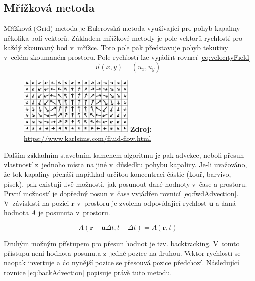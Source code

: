 \subsection{Mřížková metoda}
\label{chapter:Grid}
Mřížková (Grid) metoda je Eulerovská metoda využívající pro pohyb kapaliny několika polí vektorů. Základem mřížkové metody je pole vektorů rychlostí pro každý zkoumaný bod v~mřížce. Toto pole pak představuje pohyb tekutiny v~celém zkoumaném prostoru. Pole rychlostí lze vyjádřit rovnicí \ref{eq:velocityField}
\begin{equation}
	\Vec{u}(x,y) = (u_x,u_y)
	\label{eq:velocityField}
\end{equation}

\begin{figure}[hbt]
	\captionsetup{justification=centering}
	\centering
	\includegraphics[width=0.5\textwidth]{obrazky-figures/flow-field.png}
	\textbf{Zdroj: } \url{https://www.karlsims.com/fluid-flow.html}
	\label{fig:VelocityField}
\end{figure}

Dalším základním stavebním kamenem algoritmu je pak advekce, neboli přesun vlastností z~jednoho místa na jiné v~důsledku pohybu kapaliny. Je-li uvažováno, že tok kapaliny přenáší například určitou koncentraci částic (kouř, barvivo, písek), pak existují dvě možnosti, jak posunout dané hodnoty v~čase a prostoru.  První možností je dopředný posun v~čase vyjádřen rovnicí \ref{eq:fwdAdvection}. V~závislosti na pozici $\mathbf{r}$ v~prostoru je zvolena odpovídající rychlost $\mathbf{u}$ a daná hodnota $A$ je posunuta v~prostoru.

\begin{equation}
	A(\mathbf{r} + \mathbf{u}\Delta t, t + \Delta t) = A(\mathbf{r}, t)
	\label{eq:fwdAdvection}
\end{equation}

Druhým možným přístupem pro přesun hodnot je tzv. backtracking. V~tomto přístupu není hodnota posunuta z~jedné pozice na druhou. Vektor rychlosti se naopak invertuje a do nynější pozice se přesouvá pozice předchozí. Následující rovnice \ref{eq:backAdvection} popisuje právě tuto metodu. \cite{webglFluid}

